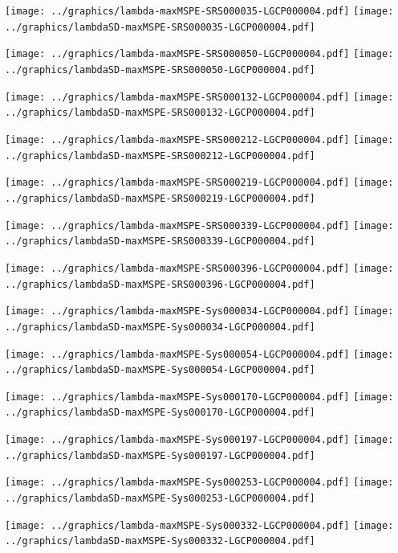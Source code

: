 \documentclass[review]{elsarticle}
\begin{document}
\texttt{[image: ../graphics/lambda-maxMSPE-SRS000035-LGCP000004.pdf]}
\texttt{[image: ../graphics/lambdaSD-maxMSPE-SRS000035-LGCP000004.pdf]}

\texttt{[image: ../graphics/lambda-maxMSPE-SRS000050-LGCP000004.pdf]}
\texttt{[image: ../graphics/lambdaSD-maxMSPE-SRS000050-LGCP000004.pdf]}

\texttt{[image: ../graphics/lambda-maxMSPE-SRS000132-LGCP000004.pdf]}
\texttt{[image: ../graphics/lambdaSD-maxMSPE-SRS000132-LGCP000004.pdf]}

\texttt{[image: ../graphics/lambda-maxMSPE-SRS000212-LGCP000004.pdf]}
\texttt{[image: ../graphics/lambdaSD-maxMSPE-SRS000212-LGCP000004.pdf]}

\texttt{[image: ../graphics/lambda-maxMSPE-SRS000219-LGCP000004.pdf]}
\texttt{[image: ../graphics/lambdaSD-maxMSPE-SRS000219-LGCP000004.pdf]}

\texttt{[image: ../graphics/lambda-maxMSPE-SRS000339-LGCP000004.pdf]}
\texttt{[image: ../graphics/lambdaSD-maxMSPE-SRS000339-LGCP000004.pdf]}

\texttt{[image: ../graphics/lambda-maxMSPE-SRS000396-LGCP000004.pdf]}
\texttt{[image: ../graphics/lambdaSD-maxMSPE-SRS000396-LGCP000004.pdf]}

\texttt{[image: ../graphics/lambda-maxMSPE-Sys000034-LGCP000004.pdf]}
\texttt{[image: ../graphics/lambdaSD-maxMSPE-Sys000034-LGCP000004.pdf]}

\texttt{[image: ../graphics/lambda-maxMSPE-Sys000054-LGCP000004.pdf]}
\texttt{[image: ../graphics/lambdaSD-maxMSPE-Sys000054-LGCP000004.pdf]}

\texttt{[image: ../graphics/lambda-maxMSPE-Sys000170-LGCP000004.pdf]}
\texttt{[image: ../graphics/lambdaSD-maxMSPE-Sys000170-LGCP000004.pdf]}

\texttt{[image: ../graphics/lambda-maxMSPE-Sys000197-LGCP000004.pdf]}
\texttt{[image: ../graphics/lambdaSD-maxMSPE-Sys000197-LGCP000004.pdf]}

\texttt{[image: ../graphics/lambda-maxMSPE-Sys000253-LGCP000004.pdf]}
\texttt{[image: ../graphics/lambdaSD-maxMSPE-Sys000253-LGCP000004.pdf]}

\texttt{[image: ../graphics/lambda-maxMSPE-Sys000332-LGCP000004.pdf]}
\texttt{[image: ../graphics/lambdaSD-maxMSPE-Sys000332-LGCP000004.pdf]}


\end{document}
